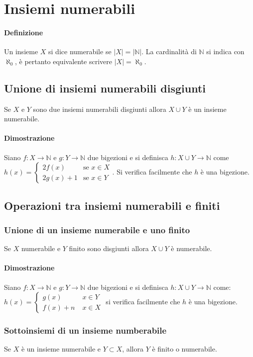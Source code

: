 \chapter{Insiemi numerabili}
\subsubsection{Definizione}
Un insieme $X$ si dice numerabile se $|X|=|\mathbb{N}|$. La cardinalit\`a di $\mathbb{N}$ si indica con $\aleph_0$, \`e pertanto equivalente scrivere $|X|=\aleph_0$.
\section{Unione di insiemi numerabili disgiunti}
Se $X$ e $Y$ sono due insiemi numerabili disgiunti allora $X\cup Y$ \`e un insieme numerabile.
\subsubsection{Dimostrazione}
Siano $f:X\rightarrow \mathbb{N}$ e $g:Y\rightarrow\mathbb{N}$ due bigezioni e si definisca $h:X\cup Y\rightarrow\mathbb{N}$ come
$h(x)=
\begin{cases}
2f(x)&\text{se }x\in X\\
2g(x)+1&\text{se }x\in Y
\end{cases} 
$. Si verifica facilmente che $h$ \`e una bigezione.
\section{Operazioni tra insiemi numerabili e finiti}
\subsection{Unione di un insieme numerabile e uno finito}
Se $X$ numerabile e $Y$ finito sono disgiunti allora $X\cup Y$ \`e numerabile.
\subsubsection{Dimostrazione}
Siano $f:X\rightarrow \mathbb{N}$ e $g:Y\rightarrow\mathbb{N}$ due bigezioni e si definisca $h:X\cup Y\rightarrow\mathbb{N}$ come:$
h(x)=\begin{cases}
g(x)\;&x\in Y\\
f(x)+n\;&x\in X
\end{cases}$ si verifica facilmente che $h$ \`e una bigezione.
\subsection{Sottoinsiemi di un insieme numberabile}
Se $X$ \`e un insieme numerabile e $Y\subset X$, allora $Y$ \`e finito o numerabile.
